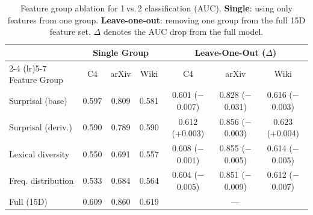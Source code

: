 \begin{table}[t]
\centering
\small
\caption{Feature group ablation for 1\,vs.\,2 classification (AUC). \textbf{Single}: using only features from one group. \textbf{Leave-one-out}: removing one group from the full 15D feature set. $\Delta$ denotes the AUC drop from the full model.}
\label{tab:feature_ablation}
\begin{tabular}{l ccc ccc}
\toprule
& \multicolumn{3}{c}{\textbf{Single Group}} & \multicolumn{3}{c}{\textbf{Leave-One-Out ($\Delta$)}} \\
\cmidrule(lr){2-4} \cmidrule(lr){5-7}
Feature Group & C4 & arXiv & Wiki & C4 & arXiv & Wiki \\
\midrule
Surprisal (base) & 0.597 & 0.809 & 0.581 & 0.601 ($-$0.007) & 0.828 ($-$0.031) & 0.616 ($-$0.003) \\
Surprisal (deriv.) & 0.590 & 0.789 & 0.590 & 0.612 (+0.003) & 0.856 ($-$0.003) & 0.623 (+0.004) \\
Lexical diversity & 0.550 & 0.691 & 0.557 & 0.608 ($-$0.001) & 0.855 ($-$0.005) & 0.614 ($-$0.005) \\
Freq. distribution & 0.533 & 0.684 & 0.564 & 0.604 ($-$0.005) & 0.851 ($-$0.009) & 0.612 ($-$0.007) \\
\midrule
Full (15D) & 0.609 & 0.860 & 0.619 & \multicolumn{3}{c}{---} \\
\bottomrule
\end{tabular}
\end{table}
